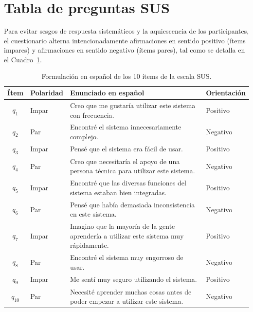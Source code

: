 \section{Tabla de preguntas SUS}
Para evitar sesgos de respuesta sistemáticos y la aquiescencia de los participantes, el cuestionario alterna intencionadamente afirmaciones en sentido positivo (ítems impares) y afirmaciones en sentido negativo (ítems pares), tal como se detalla en el Cuadro~\ref{tab:items-sus}.

\begin{table}[htbp]
\centering
\small
\begin{tabular}{clp{9.5cm}l}
\toprule
\textbf{Ítem} & \textbf{Polaridad} & \textbf{Enunciado en español} & \textbf{Orientación} \\
\midrule
$q_1$  & Impar & Creo que me gustaría utilizar este sistema con frecuencia. & Positivo \\
$q_2$  & Par   & Encontré el sistema innecesariamente complejo. & Negativo \\
$q_3$  & Impar & Pensé que el sistema era fácil de usar. & Positivo \\
$q_4$  & Par   & Creo que necesitaría el apoyo de una persona técnica para utilizar este sistema. & Negativo \\
$q_5$  & Impar & Encontré que las diversas funciones del sistema estaban bien integradas. & Positivo \\
$q_6$  & Par   & Pensé que había demasiada inconsistencia en este sistema. & Negativo \\
$q_7$  & Impar & Imagino que la mayoría de la gente aprendería a utilizar este sistema muy rápidamente. & Positivo \\
$q_8$  & Par   & Encontré el sistema muy engorroso de usar. & Negativo \\
$q_9$  & Impar & Me sentí muy seguro utilizando el sistema. & Positivo \\
$q_{10}$ & Par & Necesité aprender muchas cosas antes de poder empezar a utilizar este sistema. & Negativo \\
\bottomrule
\end{tabular}
\caption{Formulación en español de los 10 ítems de la escala SUS.}
\label{tab:items-sus}
\end{table}

